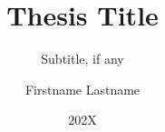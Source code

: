 \documentclass{labthesis}
\author{Firstname Lastname}
\date{202X}
\title{Thesis Title}
\subtitle{Subtitle, if any}
\begin{document}
  \frontmatter
  \pagestyle{empty}
  
  
  \begin{otherlanguage}{finnish}
    
  \end{otherlanguage}
  \tableofcontents

  \mainmatter
  \pagestyle{myheadings}
  
  
  

  \backmatter
  \begin{raggedright}
    
  \end{raggedright}
  \appendix
\end{document}
